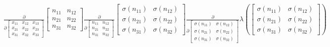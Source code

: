 \documentclass[11pt]{article}
\begin{document}
    $\displaystyle \frac{\partial}{\partial \left[\begin{matrix}x_{11} & x_{12} & x_{13}\\x_{21} & x_{22} & x_{23}\\x_{31} & x_{32} & x_{33}\end{matrix}\right]} \left[\begin{matrix}n_{11} & n_{12}\\n_{21} & n_{22}\\n_{31} & n_{32}\end{matrix}\right] \frac{\partial}{\partial \left[\begin{matrix}n_{11} & n_{12}\\n_{21} & n_{22}\\n_{31} & n_{32}\end{matrix}\right]} \left[\begin{matrix}\sigma{\left(n_{11} \right)} & \sigma{\left(n_{12} \right)}\\\sigma{\left(n_{21} \right)} & \sigma{\left(n_{22} \right)}\\\sigma{\left(n_{31} \right)} & \sigma{\left(n_{32} \right)}\end{matrix}\right] \frac{\partial}{\partial \left[\begin{matrix}\sigma{\left(n_{11} \right)} & \sigma{\left(n_{12} \right)}\\\sigma{\left(n_{21} \right)} & \sigma{\left(n_{22} \right)}\\\sigma{\left(n_{31} \right)} & \sigma{\left(n_{32} \right)}\end{matrix}\right]} \lambda{\left(\left[\begin{matrix}\sigma{\left(n_{11} \right)} & \sigma{\left(n_{12} \right)}\\\sigma{\left(n_{21} \right)} & \sigma{\left(n_{22} \right)}\\\sigma{\left(n_{31} \right)} & \sigma{\left(n_{32} \right)}\end{matrix}\right] \right)}$

    
\end{document}
